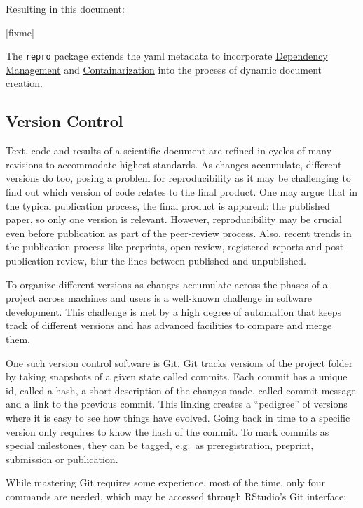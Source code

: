 \documentclass[12pt,a4paper,]{article}
\begin{document}
Resulting in this document:

{[}fixme{]}

The \texttt{repro} package extends the yaml metadata to incorporate \protect\hyperlink{dependency-management}{Dependency Management} and \protect\hyperlink{containarization}{Containarization} into the process of dynamic document creation.

\hypertarget{version-control}{%
\subsection{Version Control}\label{version-control}}

Text, code and results of a scientific document are refined in cycles of many revisions to accommodate highest standards.
As changes accumulate, different versions do too, posing a problem for reproducibility as it may be challenging to find out which version of code relates to the final product.
One may argue that in the typical publication process, the final product is apparent: the published paper, so only one version is relevant.
However, reproducibility may be crucial even before publication as part of the peer-review process.
Also, recent trends in the publication process like preprints, open review, registered reports and post-publication review, blur the lines between published and unpublished.

To organize different versions as changes accumulate across the phases of a project across machines and users is a well-known challenge in software development.
This challenge is met by a high degree of automation that keeps track of different versions and has advanced facilities to compare and merge them.

One such version control software is Git. Git tracks versions of the project folder by taking snapshots of a given state called commits.
Each commit has a unique id, called a hash, a short description of the changes made, called commit message and a link to the previous commit.
This linking creates a ``pedigree'' of versions where it is easy to see how things have evolved.
Going back in time to a specific version only requires to know the hash of the commit.
To mark commits as special milestones, they can be tagged, e.g.~as preregistration, preprint, submission or publication.

While mastering Git requires some experience, most of the time, only four commands are needed, which may be accessed through RStudio's Git interface:
\end{document}
